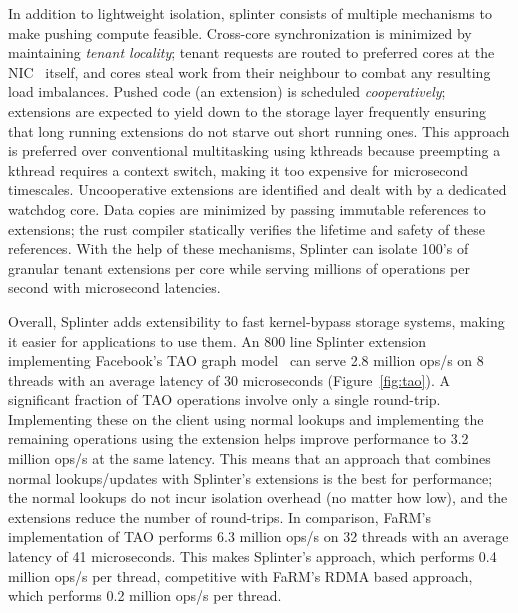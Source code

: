 In addition to lightweight isolation, splinter consists of multiple
mechanisms to make pushing compute feasible.
%
Cross-core synchronization
is minimized by maintaining \emph{tenant locality}; tenant requests are
routed
to preferred cores at the NIC~\cite{flow-director} itself, and cores
steal work from
their neighbour to combat any resulting load imbalances.
%
Pushed code (an extension) is scheduled \emph{cooperatively}; extensions are
expected to yield down to the storage layer frequently ensuring that
long running extensions do not starve out short running ones.
%
This
approach is preferred over conventional multitasking using kthreads
because preempting a kthread requires a context switch, making it too
expensive for microsecond timescales.
%
Uncooperative extensions are
identified and dealt with by a dedicated watchdog core.
%
Data copies are
minimized by passing immutable references to extensions; the rust
compiler statically verifies the lifetime and safety of these
references.
%
With the help of these mechanisms, Splinter can isolate
100’s of granular tenant extensions per core while serving millions of
operations per second with microsecond latencies.



Overall, Splinter adds extensibility to fast kernel-bypass storage
systems, making it easier for applications to use them.
%
An 800 line Splinter extension implementing Facebook’s TAO graph
model~\cite{tao-2013}
can serve 2.8 million ops/s on 8 threads with an average latency of
30 microseconds (Figure~\ref{fig:tao}).
%
A significant fraction of TAO operations involve only a single
round-trip.
%
Implementing these on the client using normal lookups and
implementing the remaining operations using the extension helps improve
performance to 3.2 million ops/s at the same latency.
%
This means that an
approach that combines normal lookups/updates with Splinter’s extensions
is the best for performance; the normal lookups do not incur isolation
overhead (no matter how low), and the extensions reduce the number of
round-trips.
%
In comparison, FaRM’s~\cite{farm-2014} implementation of TAO performs
6.3 million
ops/s on 32 threads with an average latency of 41 microseconds.
%
This
makes Splinter’s approach, which performs 0.4 million ops/s per thread,
competitive with FaRM’s RDMA based approach, which performs 0.2 million
ops/s per thread.
